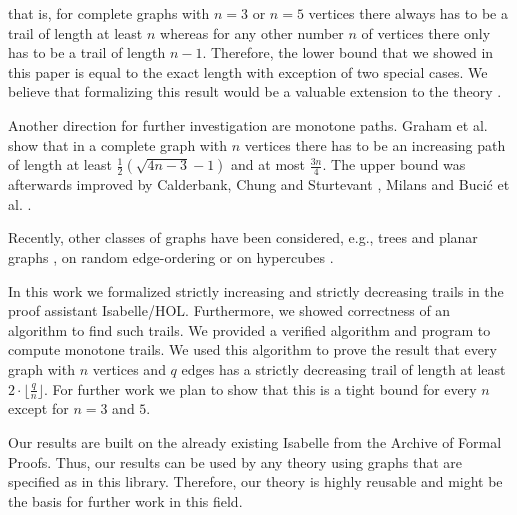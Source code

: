 \begin{isabellebody}
\begin{isamarkuptext}
\noindent that is, for complete graphs with $n=3$ or $n=5$ vertices there always has to be a trail of length at least $n$ whereas 
for any other number $n$ of vertices there only has to be a trail of length $n - 1$. Therefore, the lower bound that
we showed in this paper is equal to the exact length with exception of two special cases.  
We believe that formalizing this result would be a valuable extension to the theory .

Another direction for further investigation are monotone paths. 
Graham et al. \cite{graham1973increasing} show that in a complete graph with $n$ vertices there has to be an increasing path of length 
at least $\frac{1}{2}(\sqrt{4n-3}-1)$ and at most $\frac{3n}{4}$. 
The upper bound was afterwards improved by Calderbank, Chung and Sturtevant \cite{calderbank1984increasing}, 
Milans \cite{milans2015monotone} and Buci{\'c} et al. \cite{bucic2018nearly}. 

Recently, other classes of graphs have been considered, e.g., trees and planar graphs \cite{roditty2001monotone},
on random edge-ordering \cite{yuster2001large} or on hypercubes \cite{de2015increasing}.%
\end{isamarkuptext}\isamarkuptrue%
%
\isadelimdocument
%
\endisadelimdocument
%
\isatagdocument
%
\isamarkuptrue%
%
\endisatagdocument
{\isafolddocument}%
%
\isadelimdocument
%
\endisadelimdocument
%
\begin{isamarkuptext}%
In this work we formalized strictly increasing and strictly decreasing trails in the proof assistant Isabelle/HOL. 
Furthermore, we showed correctness of an algorithm to find such trails. We provided a verified algorithm and program to compute monotone trails. 
We used this algorithm to
prove the result that every graph with $n$ vertices and $q$ edges has a strictly decreasing trail of length at least
$2\cdot\lfloor\frac{q}{n}\rfloor$. For further work we plan to show that this is a tight bound for every $n$ except for $n = 3$ and $5$. 

Our results are built on the already existing Isabelle  from the Archive of Formal Proofs. 
Thus, our results can be used by any theory using graphs that are specified as in this library.
Therefore, our theory is highly reusable and might be the basis for further work in this field.%
\end{isamarkuptext}\isamarkuptrue%
%
\isadelimtheory
%
\endisadelimtheory
%
\isatagtheory
%
\endisatagtheory
{\isafoldtheory}%
%
\isadelimtheory
%
\endisadelimtheory
%
\end{isabellebody}%
